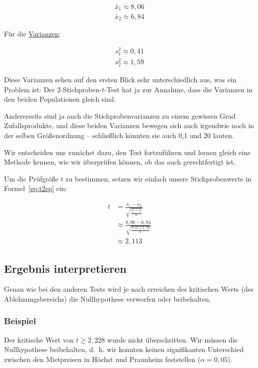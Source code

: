 \documentclass[
  11pt,
  ngerman,
  a4paper,
]{report}
\begin{document}
\[
\begin{aligned}
\bar{x}_1\approx8{,}06\\[4pt]
\bar{x}_2\approx6{,}84
\end{aligned}
\]

Für die \protect\hyperlink{varianz}{Varianzen}:

\[
\begin{aligned}
s^2_1\approx0{,}41\\[4pt]
s^2_2\approx1{,}59
\end{aligned}
\]

Diese Varianzen sehen auf den ersten Blick sehr unterschiedlich aus, was ein Problem ist: Der 2-Stichproben-\(t\)-Test hat ja zur Annahme, dass die Varianzen in den beiden Populationen gleich sind.

Andererseits sind ja auch die Stichprobenvarianzen zu einem gewissen Grad Zufallsprodukte, und diese beiden Varianzen bewegen sich auch irgendwie noch in der selben Größenordnung -- schließlich könnten sie auch 0,1 und 20 lauten.

Wir entscheiden uns zunächst dazu, den Test fortzuführen und lernen gleich eine Methode kennen, wie wir überprüfen können, ob das auch gerechtfertigt ist.

Um die Prüfgröße \(t\) zu bestimmen, setzen wir einfach unsere Stichprobenwerte in Formel~\eqref{eq:t2sp} ein:

\[
\begin{aligned}
t&=\frac{\bar{x}_1-\bar{x}_2}{\sqrt{\frac{s^2_1+s^2_2}{n}}}\\
&\approx\frac{8{,}06-6{,}84}{\sqrt{\frac{0{,}41+1{,}59}{6}}}\\
&\approx2{,}113
\end{aligned}
\]

\hypertarget{ergebnis-interpretieren-1}{%
\subsection{Ergebnis interpretieren}\label{ergebnis-interpretieren-1}}

Genau wie bei den anderen Tests wird je nach erreichen des kritischen Werts (des Ablehnungsbereichs) die Nullhypothese verworfen oder beibehalten.

\hypertarget{beispiel-16}{%
\subsubsection{Beispiel}\label{beispiel-16}}

Der kritische Wert von \(t \geq 2{,}228\) wurde nicht überschritten. Wir müssen die Nullhypothese beibehalten, d.~h. wir konnten keinen signifikanten Unterschied zwischen den Mietpreisen in Höchst und Praunheim feststellen (\(\alpha=0{,}05\)).
\end{document}
